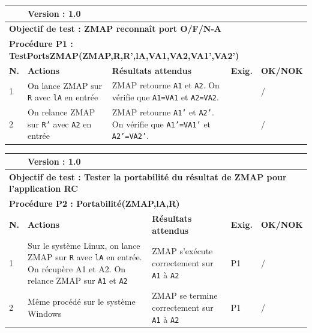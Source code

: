 \documentclass[a4paper,11pt,french]{article}
\begin{document}
\noindent
\begin{tabular}{|p{0.5cm}| p{6cm} | p{1cm} | p{4cm} | p{1.5cm}| p{1.5cm}|} 
\hline
\rowcolor{blue}
\multicolumn{2}{|l|}{\color{white}\bfseries{Objet testé : \color{white} \bfseries{ZMAP} }} & 
\multicolumn{4}{l|}{\color{white}\bfseries{Version : \color{white}\bfseries{1.0} }}\\
\hline
\multicolumn{6}{|l|}{\textbf{Objectif de test : ZMAP reconnaît port O/F/N-A} }\\
\hline
\multicolumn{6}{|l|}{\textbf{Procédure P1 : TestPortsZMAP(ZMAP,R,R',lA,VA1,VA2,VA1',VA2')} }\\
\hline
\textbf{N.} & \textbf{Actions} & \multicolumn{2}{p{5cm}|}{\textbf{Résultats attendus}} & \textbf{Exig.} & \textbf{OK/NOK} \\
\hline
1 & On lance ZMAP sur \texttt{R} avec \texttt{lA} en entrée  & \multicolumn{2}{p{6cm}|}{ZMAP retourne \texttt{A1} et \texttt{A2}. On vérifie que \texttt{A1=VA1} et \texttt{A2=VA2}. } &  & / \\
\hline
2 & On relance ZMAP sur \texttt{R'} avec \texttt{A2} en entrée  & \multicolumn{2}{p{6cm}|}{ZMAP retourne \texttt{A1'} et \texttt{A2'}. On vérifie que \texttt{A1'=VA1'} et \texttt{A2'=VA2'}. } & &  / \\
\hline
\end{tabular}

\vspace{0.7cm}

\noindent
\begin{tabular}{|p{0.5cm}| p{6cm} | p{1cm} | p{4cm} | p{1.5cm}| p{1.5cm}|} 
\hline
\rowcolor{blue}
\multicolumn{2}{|l|}{\color{white}\bfseries{Objet testé : \color{white} \bfseries{ZMAP} }} & 
\multicolumn{4}{l|}{\color{white}\bfseries{Version : \color{white}\bfseries{1.0} }}\\
\hline
\multicolumn{6}{|l|}{\textbf{Objectif de test : Tester la portabilité du résultat de ZMAP pour l'application RC} }\\
\hline
\multicolumn{6}{|l|}{\textbf{Procédure P2 : Portabilité(ZMAP,lA,R)} }\\
\hline
\textbf{N.} & \textbf{Actions} & \multicolumn{2}{p{5cm}|}{\textbf{Résultats attendus}} & \textbf{Exig.} & \textbf{OK/NOK} \\
\hline
1 & Sur le système Linux, on lance ZMAP sur \texttt{R} avec \texttt{lA} en entrée. On récupère A1 et A2. On relance ZMAP sur \texttt{A1} et \texttt{A2} & \multicolumn{2}{p{6cm}|}{ZMAP s'exécute correctement sur \texttt{A1} à \texttt{A2}} & P1 & / \\
\hline
2 & Même procédé sur le système Windows & \multicolumn{2}{p{6cm}|}{ZMAP se termine correctement sur \texttt{A1} à \texttt{A2}} & P1 & / \\
\hline
\end{tabular}
\end{document}
